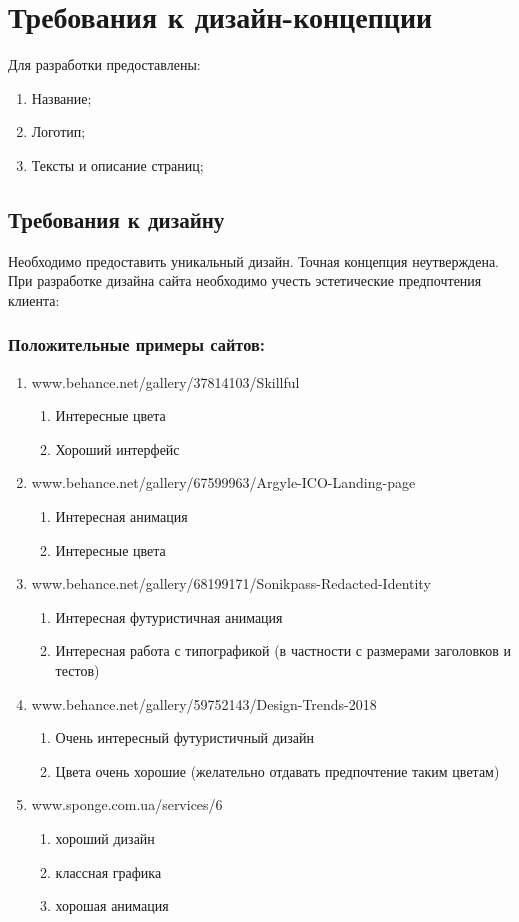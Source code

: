 \section{Требования к дизайн-концепции}
Для разработки предоставлены:
\begin{enumerate}
  \item Название;
  \item Логотип;
  \item Тексты и описание страниц;
\end{enumerate}

\subsection{Требования к дизайну}
  Необходимо предоставить уникальный дизайн. Точная концепция неутверждена.
  При разработке дизайна сайта необходимо учесть эстетические предпочтения клиента:
\subsubsection{Положительные примеры сайтов:}
\begin{enumerate}
  \item www.behance.net/gallery/37814103/Skillful
  \begin{enumerate}
    \item Интересные цвета
    \item Хороший интерфейс
  \end{enumerate}
  \item www.behance.net/gallery/67599963/Argyle-ICO-Landing-page
  \begin{enumerate}
    \item Интересная анимация
    \item Интересные цвета
  \end{enumerate}

  \item www.behance.net/gallery/68199171/Sonikpass-Redacted-Identity
  \begin{enumerate}
    \item Интересная футуристичная анимация
    \item Интересная работа с типографикой (в частности с размерами заголовков и тестов)
  \end{enumerate}

  \item www.behance.net/gallery/59752143/Design-Trends-2018
  \begin{enumerate}
    \item Очень интересный футуристичный дизайн
    \item Цвета очень хорошие (желательно отдавать предпочтение таким цветам)
  \end{enumerate}

  \item www.sponge.com.ua/services/6
  \begin{enumerate}
    \item хороший дизайн
    \item классная графика
    \item хорошая анимация
  \end{enumerate}
\end{enumerate}

